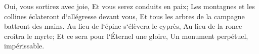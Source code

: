 \verse Oui, vous sortirez avec joie, Et vous serez conduits en paix; Les montagnes et les collines éclateront d`allégresse devant vous, Et tous les arbres de la campagne battront des mains. 
\verse Au lieu de l`épine s`élèvera le cyprès, Au lieu de la ronce croîtra le myrte; Et ce sera pour l`Éternel une gloire, Un monument perpétuel, impérissable. 

\chapter{}

